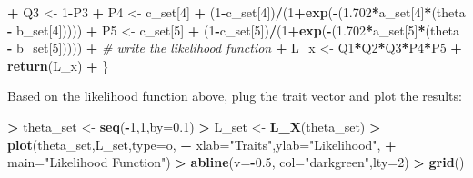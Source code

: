 \documentclass[
]{article}
\newenvironment{Shaded}{\begin{snugshade}}{\end{snugshade}}
\newcommand{\AttributeTok}[1]{\textcolor[rgb]{0.13,0.29,0.53}{#1}}
\newcommand{\CommentTok}[1]{\textcolor[rgb]{0.56,0.35,0.01}{\textit{#1}}}
\newcommand{\DecValTok}[1]{\textcolor[rgb]{0.00,0.00,0.81}{#1}}
\newcommand{\FloatTok}[1]{\textcolor[rgb]{0.00,0.00,0.81}{#1}}
\newcommand{\FunctionTok}[1]{\textcolor[rgb]{0.13,0.29,0.53}{\textbf{#1}}}
\newcommand{\NormalTok}[1]{#1}
\newcommand{\OtherTok}[1]{\textcolor[rgb]{0.56,0.35,0.01}{#1}}
\newcommand{\SpecialCharTok}[1]{\textcolor[rgb]{0.81,0.36,0.00}{\textbf{#1}}}
\newcommand{\StringTok}[1]{\textcolor[rgb]{0.31,0.60,0.02}{#1}}
\begin{document}
\begin{Shaded}
\begin{Highlighting}[]
\SpecialCharTok{+}\NormalTok{   Q3 }\OtherTok{\textless{}{-}} \DecValTok{1}\SpecialCharTok{{-}}\NormalTok{P3}
\SpecialCharTok{+}\NormalTok{   P4 }\OtherTok{\textless{}{-}}\NormalTok{ c\_set[}\DecValTok{4}\NormalTok{] }\SpecialCharTok{+}\NormalTok{ (}\DecValTok{1}\SpecialCharTok{{-}}\NormalTok{c\_set[}\DecValTok{4}\NormalTok{])}\SpecialCharTok{/}\NormalTok{(}\DecValTok{1}\SpecialCharTok{+}\FunctionTok{exp}\NormalTok{(}\SpecialCharTok{{-}}\NormalTok{(}\FloatTok{1.702}\SpecialCharTok{*}\NormalTok{a\_set[}\DecValTok{4}\NormalTok{]}\SpecialCharTok{*}\NormalTok{(theta }\SpecialCharTok{{-}}\NormalTok{ b\_set[}\DecValTok{4}\NormalTok{]))))}
\SpecialCharTok{+}\NormalTok{   P5 }\OtherTok{\textless{}{-}}\NormalTok{ c\_set[}\DecValTok{5}\NormalTok{] }\SpecialCharTok{+}\NormalTok{ (}\DecValTok{1}\SpecialCharTok{{-}}\NormalTok{c\_set[}\DecValTok{5}\NormalTok{])}\SpecialCharTok{/}\NormalTok{(}\DecValTok{1}\SpecialCharTok{+}\FunctionTok{exp}\NormalTok{(}\SpecialCharTok{{-}}\NormalTok{(}\FloatTok{1.702}\SpecialCharTok{*}\NormalTok{a\_set[}\DecValTok{5}\NormalTok{]}\SpecialCharTok{*}\NormalTok{(theta }\SpecialCharTok{{-}}\NormalTok{ b\_set[}\DecValTok{5}\NormalTok{]))))}
\SpecialCharTok{+}   \CommentTok{\# write the likelihood function}
\SpecialCharTok{+}\NormalTok{   L\_x }\OtherTok{\textless{}{-}}\NormalTok{ Q1}\SpecialCharTok{*}\NormalTok{Q2}\SpecialCharTok{*}\NormalTok{Q3}\SpecialCharTok{*}\NormalTok{P4}\SpecialCharTok{*}\NormalTok{P5}
\SpecialCharTok{+}   \FunctionTok{return}\NormalTok{(L\_x)}
\SpecialCharTok{+}\NormalTok{ \}}
\end{Highlighting}
\end{Shaded}

Based on the likelihood function above, plug the trait vector and plot
the results:

\begin{Shaded}
\begin{Highlighting}[]
\SpecialCharTok{\textgreater{}}\NormalTok{ theta\_set }\OtherTok{\textless{}{-}} \FunctionTok{seq}\NormalTok{(}\SpecialCharTok{{-}}\DecValTok{1}\NormalTok{,}\DecValTok{1}\NormalTok{,}\AttributeTok{by=}\FloatTok{0.1}\NormalTok{)}
\SpecialCharTok{\textgreater{}}\NormalTok{ L\_set }\OtherTok{\textless{}{-}} \FunctionTok{L\_X}\NormalTok{(theta\_set)}
\SpecialCharTok{\textgreater{}} \FunctionTok{plot}\NormalTok{(theta\_set,L\_set,}\AttributeTok{type=}\StringTok{\textquotesingle{}o\textquotesingle{}}\NormalTok{,}
\SpecialCharTok{+}      \AttributeTok{xlab=}\StringTok{"Traits"}\NormalTok{,}\AttributeTok{ylab=}\StringTok{"Likelihood"}\NormalTok{,}
\SpecialCharTok{+}      \AttributeTok{main=}\StringTok{"Likelihood Function"}\NormalTok{)}
\SpecialCharTok{\textgreater{}} \FunctionTok{abline}\NormalTok{(}\AttributeTok{v=}\SpecialCharTok{{-}}\FloatTok{0.5}\NormalTok{, }\AttributeTok{col=}\StringTok{"darkgreen"}\NormalTok{,}\AttributeTok{lty=}\DecValTok{2}\NormalTok{)}
\SpecialCharTok{\textgreater{}} \FunctionTok{grid}\NormalTok{()}
\end{Highlighting}
\end{Shaded}
\end{document}
